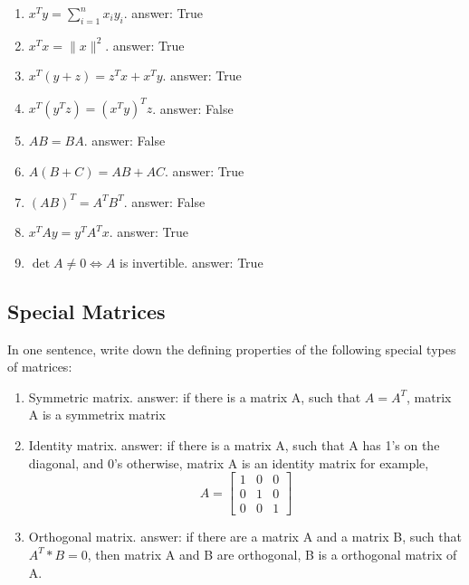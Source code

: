 \documentclass{article}
\def\blu#1{{\color{blu}#1}}
\def\norm#1{\|#1\|}
\def\enum#1{\begin{enumerate}#1\end{enumerate}}
\begin{document}
\begin{enumerate}
\item $x^Ty = \sum_{i=1}^n x_iy_i$. 
\newline
answer: True
\item $x^Tx = \norm{x}^2$.
\newline
answer: True
\item $x^T(y+z) = z^Tx + x^Ty$.
\newline
answer: True
\item $x^T(y^Tz) = (x^Ty)^Tz$.
\newline
answer: False
\item $AB=BA$.
\newline
answer: False
\item $A(B + C) = AB + AC$.
\newline
answer: True
\item $(AB)^T = A^TB^T$.
\newline
answer: False
\item $x^TAy = y^TA^Tx$.
\newline
answer: True
\item $\det A \neq 0 \iff A$ is invertible.
\newline
answer: True
\end{enumerate}

\subsection{Special Matrices}

\blu{In one sentence, write down the defining properties of the following special types of matrices}:
\enum{
\item Symmetric matrix.
\newline
answer: if there is a matrix A, such that $A = A^T$, matrix A is a symmetrix matrix
\item Identity matrix.
\newline
answer: if there is a matrix A, such that A has 1's on the diagonal, and 0's otherwise, matrix A is an identity matrix
\newline
for example,
\[
A = \left[\begin{array}{ccc}
1 & 0 & 0\\
0 & 1 & 0\\
0 & 0 & 1
\end{array}\right]
\]
\item Orthogonal matrix.
\newline
answer: if there are a matrix A and a matrix B, such that $A^T * B = 0$, then matrix A and B are orthogonal, B is a orthogonal matrix of A.
}
\end{document}
